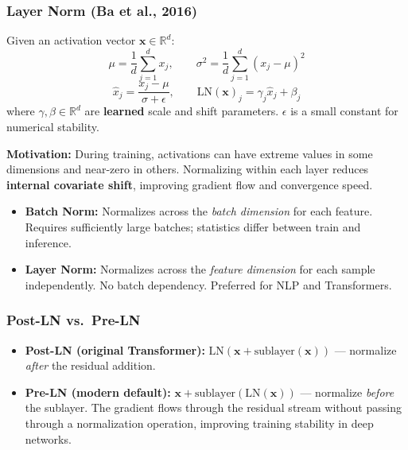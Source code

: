 \documentclass[11pt, a4paper]{article}
\begin{document}
\subsubsection{Layer Norm (Ba et al., 2016)}

\begin{defbox}
Given an activation vector $\mathbf{x} \in \mathbb{R}^d$:
\[
\mu = \frac{1}{d}\sum_{j=1}^d x_j, \qquad \sigma^2 = \frac{1}{d}\sum_{j=1}^d (x_j - \mu)^2
\]
\[
\hat{x}_j = \frac{x_j - \mu}{\sigma + \epsilon}, \qquad \text{LN}(\mathbf{x})_j = \gamma_j \hat{x}_j + \beta_j
\]
where $\gamma, \beta \in \mathbb{R}^d$ are \textbf{learned} scale and shift parameters. $\epsilon$ is a small constant for numerical stability.
\end{defbox}

\textbf{Motivation:} During training, activations can have extreme values in some dimensions and near-zero in others. Normalizing within each layer reduces \textbf{internal covariate shift}, improving gradient flow and convergence speed.

\begin{warnbox}
\begin{itemize}[leftmargin=1.5em]
  \item \textbf{Batch Norm:} Normalizes across the \emph{batch dimension} for each feature. Requires sufficiently large batches; statistics differ between train and inference.
  \item \textbf{Layer Norm:} Normalizes across the \emph{feature dimension} for each sample independently. No batch dependency. Preferred for NLP and Transformers.
\end{itemize}
\end{warnbox}

\subsubsection{Post-LN vs.\ Pre-LN}

\begin{itemize}[leftmargin=2em]
  \item \textbf{Post-LN (original Transformer):} $\text{LN}(\mathbf{x} + \text{sublayer}(\mathbf{x}))$ --- normalize \emph{after} the residual addition.
  \item \textbf{Pre-LN (modern default):} $\mathbf{x} + \text{sublayer}(\text{LN}(\mathbf{x}))$ --- normalize \emph{before} the sublayer. The gradient flows through the residual stream without passing through a normalization operation, improving training stability in deep networks.
\end{itemize}
\end{document}
